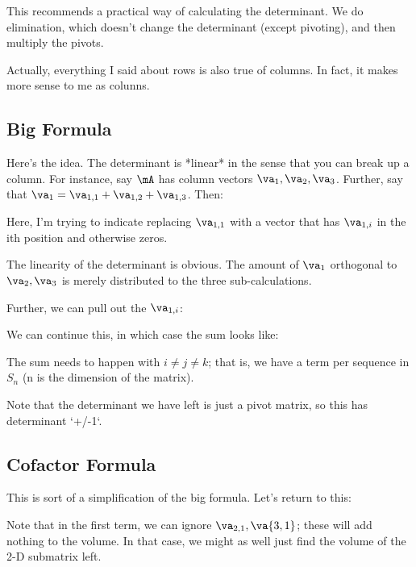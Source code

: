 This recommends a practical way of calculating the determinant. We do
elimination, which doesn't change the determinant (except pivoting), and
then multiply the pivots.

Actually, everything I said about rows is also true of columns. In
fact, it makes more sense to me as colunns.

\subsection{Big Formula}

Here's the idea. The determinant is *linear* in the sense that you can
break up a column. For instance, say $\mA$ has column vectors $\va_1,
\va_2, \va_3$. Further, say that $\va_1 = \va_{1,1} + \va_{1,2} +
\va_{1,3}$. Then:


Here, I'm trying to indicate replacing $\va_{1, 1}$ with a vector that
has $\va_{1, i}$ in the ith position and otherwise zeros.

The linearity of the determinant is obvious. The amount of $\va_1$
orthogonal to $\va_2, \va_3$ is merely distributed to the three
sub-calculations.

Further, we can pull out the $\va_{1, i}$:


We can continue this, in which case the sum looks like:


The sum needs to happen with $i \ne j \ne k$; that is, we have a term
per sequence in $S_n$ (n is the dimension of the matrix).

Note that the determinant we have left is just a pivot matrix, so this
has determinant `+/-1`.

\subsection{Cofactor Formula}

This is sort of a simplification of the big formula. Let's return to this:


Note that in the first term, we can ignore $\va_{2, 1}, \va{3, 1}$;
these will add nothing to the volume. In that case, we might as well
just find the volume of the 2-D submatrix left.


